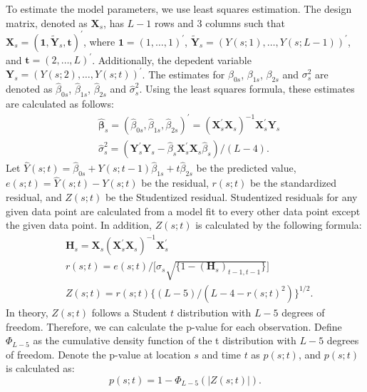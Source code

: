 \documentclass[11pt]{article}
\begin{document}
To estimate the model parameters, we use least squares estimation. The design matrix, denoted as $\bm{X}_s$, has $L-1$ rows and $3$ columns such that $\bm{X}_s=(\mathbf{1}, \tilde{\mathbf{Y}}_s, \mathbf{t})^{\prime}$, where $\mathbf{1}=(1, \ldots, 1)^{\prime}$, $\tilde{\mathbf{Y}}_s=(Y(s;1), \ldots, Y(s;L-1))^{\prime}$, and $\mathbf{t}=(2,\ldots, L)^{\prime}$. Additionally, the depedent variable $\bm{Y}_{s}=(Y(s;2), \ldots, Y(s;t))^{\prime}$. The estimates for $\beta_{0s}$, $\beta_{1s}$, $\beta_{2s}$ and $\sigma_{s}^2$ are denoted as $\hat{\beta}_{0s}$, $\hat{\beta}_{1s}$, $\hat{\beta}_{2s}$ and $\hat{\sigma}_s^2$. Using the least squares formula, these estimates are calculated as follows:
\begin{align}
	&\hat{\bm{\beta}}_s = (\hat{\beta}_{0s}, \hat{\beta}_{1s}, \hat{\beta}_{2s})^{\prime} = (\bm{X}_s^{\prime}\bm{X}_s)^{-1}\bm{X}_s^{\prime}\bm{Y}_s\\
	&\hat{\sigma}_s^2 = (\bm{Y}_s^{\prime}\bm{Y}_s - \hat{\beta}_s\bm{X}_s^{\prime}\bm{X}_s\hat{\beta}_s) / (L-4).
\end{align}
Let $\hat{Y}(s;t)=\hat{\beta}_{0s}+Y(s;t-1)\hat{\beta}_{1s}+t\hat{\beta}_{2s}$ be the predicted value,  $e(s;t)=\hat{Y}(s;t)-Y(s;t)$ be the residual, $r(s;t)$ be the standardized residual, and $Z(s;t)$ be the Studentized residual. Studentized residuals for any given data point are calculated from a model fit to every other data point except the given data point. In addition, $Z(s;t)$ is calculated by the following formula:
\begin{align}
	&\bm{H}_s=\bm{X}_s(\bm{X}_s^{\prime}\bm{X}_s)^{-1}\bm{X}_s^{\prime}\\
	&r(s;t)=e(s;t)/\big[\hat{\sigma}_s\sqrt{\{1-(\bm{H}_s)_{t-1, t-1}\}}\big]\\
	&Z(s;t)=r(s;t)\{(L-5)/(L-4-r(s;t)^2)\}^{1/2}.
\end{align}
In theory, $Z(s;t)$ follows a Student $t$ distribution with $L-5$ degrees of freedom. Therefore, we can calculate the p-value for each observation. Define $\Phi_{L-5}$ as the cumulative density function of the t distribution with $L-5$ degrees of freedom. Denote the p-value at location $s$ and time $t$ as $p(s;t)$, and $p(s;t)$ is calculated as:
\begin{equation}\label{eq: p-value}
	p(s;t)= 1-\Phi_{L-5}(|Z(s;t)|).
\end{equation}
\end{document}
